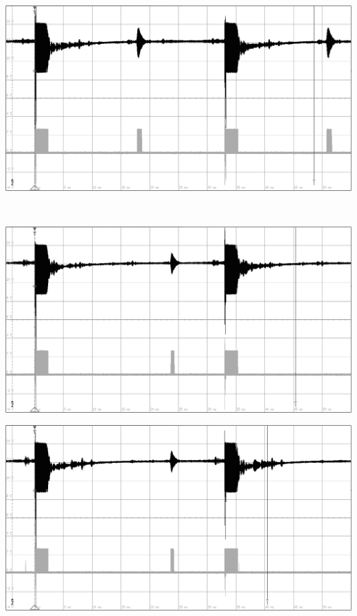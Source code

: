 \begin{minipage}{0.46\textwidth}
\includegraphics[width=1\textwidth%
]{Abbildungen/MessungenP2/20V/3m.PNG}
\end{minipage}\\
\begin{minipage}{0.46\textwidth}
\includegraphics[width=1\textwidth%
]{Abbildungen/MessungenP2/15V/4m.PNG}
\end{minipage}\qquad
\begin{minipage}{0.46\textwidth}
\includegraphics[width=1\textwidth%
]{Abbildungen/MessungenP2/20V/4m.PNG}
\end{minipage}\\
